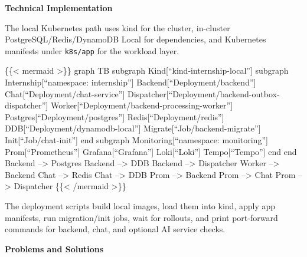 \vspace{0.5em}\noindent\textbf{Technical Implementation}\par

The local Kubernetes path uses kind for the cluster, in-cluster
PostgreSQL/Redis/DynamoDB Local for dependencies, and Kubernetes
manifests under \texttt{k8s/\allowbreak{}app} for the workload layer.

\{\{\textless{} mermaid \textgreater\}\} graph TB subgraph
Kind{[}``kind-internship-local''{]} subgraph Internship{[}``namespace:
internship''{]} Backend{[}``Deployment/backend''{]}
Chat{[}``Deployment/chat-service''{]}
Dispatcher{[}``Deployment/backend-outbox-dispatcher''{]}
Worker{[}``Deployment/backend-processing-worker''{]}
Postgres{[}``Deployment/postgres''{]} Redis{[}``Deployment/redis''{]}
DDB{[}``Deployment/dynamodb-local''{]}
Migrate{[}``Job/backend-migrate''{]} Init{[}``Job/chat-init''{]} end
subgraph Monitoring{[}``namespace: monitoring''{]}
Prom{[}``Prometheus''{]} Grafana{[}``Grafana''{]} Loki{[}``Loki''{]}
Tempo{[}``Tempo''{]} end end Backend --\textgreater{} Postgres Backend
--\textgreater{} DDB Backend --\textgreater{} Dispatcher Worker
--\textgreater{} Backend Chat --\textgreater{} Redis Chat
--\textgreater{} DDB Prom --\textgreater{} Backend Prom --\textgreater{}
Chat Prom --\textgreater{} Dispatcher \{\{\textless{} /mermaid
\textgreater\}\}

The deployment scripts build local images, load them into kind, apply
app manifests, run migration/init jobs, wait for rollouts, and print
port-forward commands for backend, chat, and optional AI service checks.

\vspace{0.5em}\noindent\textbf{Problems and Solutions}\par


